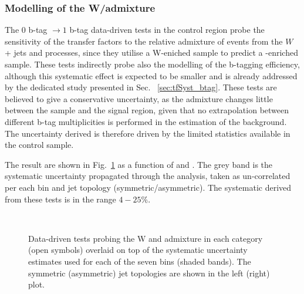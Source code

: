 \subsubsection*{Modelling of the W/\ttbar admixture}
\label{sec:tfSyst_WttAd}
The $0$ b-tag $\rightarrow1$ b-tag data-driven tests in the \mj control region 
probe the sensitivity of the transfer factors to the relative
admixture of events from the $W$ + jets and \ttbar processes, 
since they utilise a W-eniched sample to predict a \ttbar-enriched sample. 
These tests indirectly probe also the modelling of the b-tagging efficiency, 
although this systematic effect is expected to be smaller and is already addressed 
by the dedicated study presented in Sec. ~\ref{sec:tfSyst_btag}.
These tests are believed to give a conservative uncertainty, 
as the admixture changes little between the \mj sample and the signal region, 
given that no extrapolation between different b-tag multiplicities is performed 
in the estimation of the background. 
The uncertainty derived is therefore driven by the limited statistics available in the control sample. 

The result are shown in Fig.~\ref{fig:closureBTag} as a function of \scalht and \njet. 
The grey band is the systematic uncertainty propagated through the analysis, 
taken as un-correlated per each \scalht bin and jet topology (symmetric/asymmetric). The systematic derived from these tests is
in the range $4-25\%$.

\begin{figure}[h!]
  \begin{center}
    ~~
    \caption{Data-driven tests probing the W and \ttbar admixture 
      in each \njet category (open symbols) overlaid on top of the systematic
      uncertainty estimates used for each of the seven \scalht bins
      (shaded bands). 
      The symmetric (asymmetric) jet topologies are shown in the left (right) plot.      
    }
    \label{fig:closureBTag}
  \end{center} 
\end{figure}


